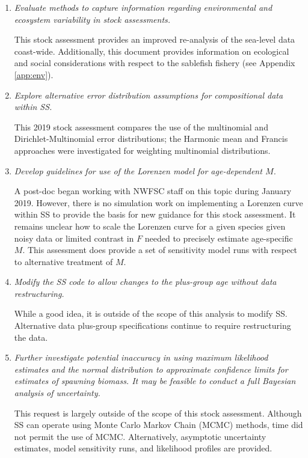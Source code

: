 \documentclass[11pt,
  english,
  a4paper,
]{article}
\begin{document}
\begin{enumerate}
\item \emph{Evaluate methods to capture information regarding environmental and ecosystem variability in stock assessments.}

This stock assessment provides an improved re-analysis of the sea-level data coast-wide. Additionally, this document provides information on ecological and social considerations with respect to the sablefish fishery (see Appendix \ref{app:env}).

\item \emph{Explore alternative error distribution assumptions for compositional data within SS. }

This 2019 stock assessment compares the use of the multinomial and Dirichlet-Multinomial error distributions; the Harmonic mean and Francis approaches were investigated for weighting multinomial distributions.

\item \emph{Develop guidelines for use of the Lorenzen model for age-dependent
$M$. }

A post-doc began working with NWFSC staff on this topic during January 2019. However, there is no simulation work on implementing a Lorenzen curve within SS to provide the basis for new guidance for this stock assessment. It remains unclear how to scale the Lorenzen curve for a given species given noisy data or limited contrast in $F$ needed to precisely estimate age-specific $M$. This assessment does provide a set of sensitivity model runs with respect to alternative treatment of $M$.

\item \emph{Modify the SS code to allow changes to the plus-group age without data restructuring.}

While a good idea, it is outside of the scope of this analysis to modify SS. Alternative data plus-group specifications continue to require restructuring the data.

\item \emph{Further investigate potential inaccuracy in using maximum likelihood estimates and the normal distribution to approximate confidence limits for estimates of spawning biomass. It may be feasible to conduct a full Bayesian analysis of uncertainty.}

This request is largely outside of the scope of this stock assessment. Although SS can operate using Monte Carlo Markov Chain (MCMC) methods, time did not permit the use of MCMC. Alternatively, asymptotic uncertainty estimates, model sensitivity runs, and likelihood profiles are provided.


\end{enumerate}
\end{document}
